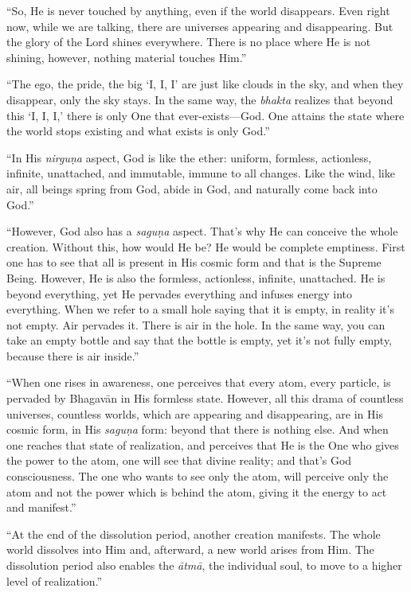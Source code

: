 \enquote{So, He is never touched by anything, even if the world disappears. Even right now, while we are talking, there are universes appearing and disappearing. But the glory of the Lord shines everywhere. There is no place where He is not shining, however, nothing material touches Him.}

\enquote{The ego, the pride, the big \enquote{I, I, I} are just like clouds in the sky, and when they disappear, only the sky stays. In the same way, the \textit{bhakta} realizes that beyond this \enquote{I, I, I,} there is only One that ever-exists---God. One attains the state where the world stops existing and what exists is only God.}

\enquote{In His \textit{nirguṇa} aspect, God is like the ether: uniform, formless, actionless, infinite, unattached, and immutable, immune to all changes. Like the wind, like air, all beings spring from God, abide in God, and naturally come back into God.}

\enquote{However, God also has a \textit{saguṇa} aspect. That’s why He can conceive the whole creation. Without this, how would He be? He would be complete emptiness. First one has to see that all is present in His cosmic form and that is the Supreme Being. However, He is also the formless, actionless, infinite, unattached. He is beyond everything, yet He pervades everything and infuses energy into everything. When we refer to a small hole saying that it is empty, in reality it’s not empty. Air pervades it. There is air in the hole. In the same way, you can take an empty bottle and say that the bottle is empty, yet it’s not fully empty, because there is air inside.}

\enquote{When one rises in awareness, one perceives that every atom, every particle, is pervaded by Bhagavān in His formless state. However, all this drama of countless universes, countless worlds, which are appearing and disappearing, are in His cosmic form, in His \textit{saguṇa} form: beyond that there is nothing else. And when one reaches that state of realization, and perceives that He is the One who gives the power to the atom, one will see that divine reality; and that’s God consciousness. The one who wants to see only the atom, will perceive only the atom and not the power which is behind the atom, giving it the energy to act and manifest.}

\enquote{At the end of the dissolution period, another creation manifests. The whole world dissolves into Him and, afterward, a new world arises from Him. The dissolution period also enables the \textit{ātmā}, the individual soul, to move to a higher level of realization.}

